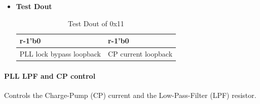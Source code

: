 \documentclass[main\_\_EN.tex]{subfiles}
\begin{document}
\begin{itemize}
\begin{itemize}
        \end{itemize}
    \item \textbf{Test Dout}
        \begin{longtable}{ |p{6cm}|p{6cm}|}
            \caption{Test Dout of 0x11}
            \label{tab:test-dout-0x11} \\
            \hline
            \rowcolor{lightgray}
            \textbf{r-1'b0} & \textbf{r-1'b0} \\ \hline
            PLL lock bypass loopback & CP current loopback \\ \hline
        \end{longtable}
\end{itemize}

\paragraph{PLL LPF and CP control}
\label{sec:test-code-0x12}
Controls the Charge-Pump (CP) current and the Low-Pass-Filter (LPF) resistor.
\end{document}
